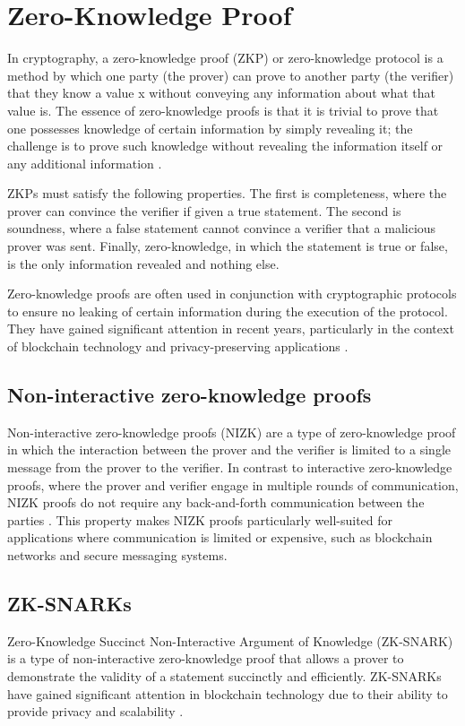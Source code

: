\section{Zero-Knowledge Proof}
In cryptography, a zero-knowledge proof (ZKP) or zero-knowledge protocol is a method by which one party (the prover) can prove to another party (the verifier) that they know a value x without conveying any information about what that value is. The essence of zero-knowledge proofs is that it is trivial to prove that one possesses knowledge of certain information by simply revealing it; the challenge is to prove such knowledge without revealing the information itself or any additional information \cite{goldreich1986proofs}.

ZKPs must satisfy the following properties. The first is completeness, where the prover can convince the verifier if given a true statement. The second is soundness, where a false statement cannot convince a verifier that a malicious prover was sent. Finally, zero-knowledge, in which the statement is true or false, is the only information revealed and nothing else.

Zero-knowledge proofs are often used in conjunction with cryptographic protocols to ensure no leaking of certain information during the execution of the protocol. They have gained significant attention in recent years, particularly in the context of blockchain technology and privacy-preserving applications \cite{bensasson2014zerocash}.

\subsection{Non-interactive zero-knowledge proofs}
Non-interactive zero-knowledge proofs (NIZK) are a type of zero-knowledge proof in which the interaction between the prover and the verifier is limited to a single message from the prover to the verifier. In contrast to interactive zero-knowledge proofs, where the prover and verifier engage in multiple rounds of communication, NIZK proofs do not require any back-and-forth communication between the parties \cite{blum1988noninteractive}. This property makes NIZK proofs particularly well-suited for applications where communication is limited or expensive, such as blockchain networks and secure messaging systems.

\subsection{ZK-SNARKs}
Zero-Knowledge Succinct Non-Interactive Argument of Knowledge (ZK-SNARK) is a type of non-interactive zero-knowledge proof that allows a prover to demonstrate the validity of a statement succinctly and efficiently. ZK-SNARKs have gained significant attention in blockchain technology due to their ability to provide privacy and scalability \cite{bensasson2013snarks}.

